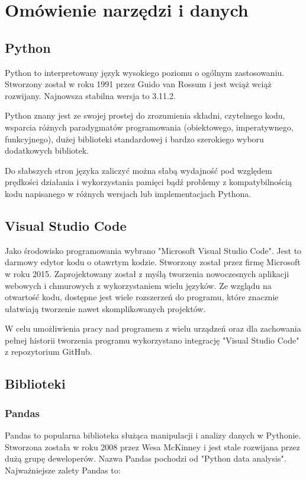 \documentclass[12pt,twoside]{article}
\begin{document}
\section{Omówienie narzędzi i danych}

\subsection{Python}

Python to interpretowany język wysokiego poziomu o ogólnym zastosowaniu.
Stworzony został w roku 1991 przez Guido van Rossum i jest wciąż wciąż rozwijany.
Najnowsza stabilna wersja to 3.11.2.

Python znany jest ze swojej prostej do zrozumienia składni,
czytelnego kodu, wsparcia różnych paradygmatów programowania (obiektowego, imperatywnego, funkcyjnego),
dużej biblioteki standardowej i bardzo szerokiego wyboru dodatkowych bibliotek. \cite{python}

Do słabszych stron języka zaliczyć można słabą wydajność pod względem prędkości działania i wykorzystania pamięci
bądź problemy z kompatybilnością kodu napisanego w różnych wersjach lub implementacjach Pythona.

\subsection{Visual Studio Code}

Jako środowisko programowania wybrano "Microsoft Visual Studio Code".
Jest to darmowy edytor kodu o otawrtym kodzie. Stworzony został przez firmę Microsoft w roku 2015.
Zaprojektowany został z myślą tworzenia nowoczesnych aplikacji webowych i chmurowych z wykorzystaniem wielu języków. \cite{VSC}
Ze wzglądu na otwartość kodu, dostępne jest wiele rozszerzeń do programu,
które znacznie ułatwiają tworzenie nawet skomplikowanych projektów.

W celu umożliwienia pracy nad programem z wielu urządzeń
oraz dla zachowania pełnej historii tworzenia programu wykorzystano integrację "Visual Studio Code" z repozytorium GitHub.
\subsection{Biblioteki}
\subsubsection{Pandas}

Pandas to popularna biblioteka służąca manipulacji i analizy danych w Pythonie.
Stworzona została w roku 2008 przez Wesa McKinney i jest stale rozwijana przez dużą grupę deweloperów.
Nazwa Pandas pochodzi od "Python data analysis".
Najważniejsze zalety Pandas to:
\end{document}
